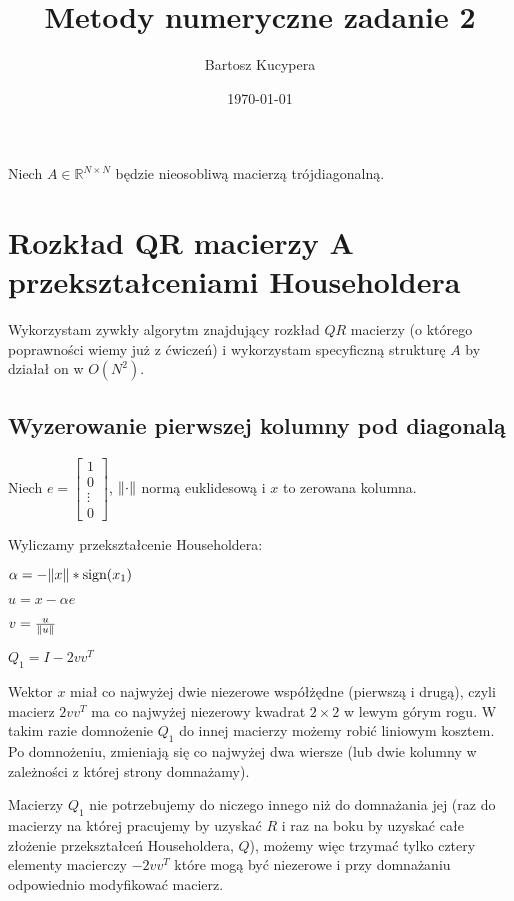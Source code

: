 \documentclass{article}
\title{Metody numeryczne zadanie 2}
\author{Bartosz Kucypera}
\date{\today}
\newcommand{\sign}{\text{sign}}
\begin{document}
\maketitle

Niech $A \in \mathbb{R}^{N \times N}$ będzie nieosobliwą macierzą trójdiagonalną.

\section*{Rozkład QR macierzy A przekształceniami Householdera}
Wykorzystam zywkły algorytm znajdujący rozkład $QR$ macierzy (o którego poprawności wiemy już z ćwiczeń) i wykorzystam specyficzną strukturę $A$ by działał on w $O(N^2)$.

\subsection*{Wyzerowanie pierwszej kolumny pod diagonalą}
Niech $e =  \begin{bmatrix} 1 \\ 0 \\ \vdots \\ 0 \end{bmatrix}$, $\norm{\cdot}$ normą euklidesową i $x$ to zerowana kolumna.

Wyliczamy przekształcenie Householdera: 

$ \alpha = -\norm{x}* \sign(x_1)$

$ u = x - \alpha e$

$ v = \frac{u}{\norm{u}} $

$Q_1 = I - 2vv^T$

Wektor $x$ miał co najwyżej dwie niezerowe współżędne (pierwszą i drugą), czyli macierz $2vv^T$ ma co najwyżej niezerowy kwadrat $2\times2$ w lewym górym rogu. \newline
W takim razie domnożenie $Q_1$ do innej macierzy możemy robić liniowym kosztem. \newline
Po domnożeniu, zmieniają się co najwyżej dwa wiersze (lub dwie kolumny w zależności z której strony domnażamy).

Macierzy $Q_1$ nie potrzebujemy do niczego innego niż do domnażania jej (raz do macierzy na której pracujemy by uzyskać $R$ i raz na boku by uzyskać całe złożenie przekształceń Householdera, $Q$), możemy więc trzymać tylko cztery elementy macierczy $-2vv^T$ które mogą być niezerowe i przy domnażaniu odpowiednio modyfikować macierz.

\newpage
\end{document}
